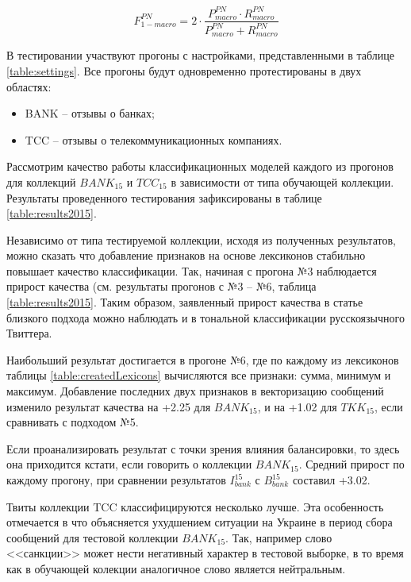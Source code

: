 \begin{equation}
    \label{eq:fmacro12}
    F_{1-macro}^{PN} = 2 \cdot \dfrac{P_{macro}^{PN} \cdot
        R_{macro}^{PN}}{P_{macro}^{PN} + R_{macro}^{PN}}
\end{equation}

В тестировании участвуют прогоны с настройками, представленными в таблице
\ref{table:settings}.
Все прогоны будут одновременно протестированы в двух областях:
\begin{itemize}
    \item BANK -- отзывы о банках;
    \item TCC -- отзывы о телекоммуникационных компаниях.
\end{itemize}



Рассмотрим качество работы классификационных моделей каждого из прогонов для
коллекций $BANK_{15}$ и $TCC_{15}$ в зависимости от типа обучающей коллекции.
Результаты проведенного тестирования зафиксированы в таблице \ref{table:results2015}.



Независимо от типа тестируемой коллекции, исходя из полученных результатов,
можно сказать что добавление признаков на основе лексиконов стабильно
повышает качество классификации.
Так, начиная с прогона №3 наблюдается прирост качества (см. результаты
прогонов с №3 -- №6, таблица \ref{table:results2015}.
Таким образом, заявленный прирост качества в статье близкого подхода
\cite{modernApproach} можно наблюдать и в тональной классификации русскоязычного
Твиттера.

Наибольший результат достигается в прогоне №6, где по каждому из лексиконов таблицы
\ref{table:createdLexicons} вычисляются все признаки: сумма, минимум и максимум.
Добавление последних двух признаков в векторизацию сообщений изменило
результат качества на +2.25 для $BANK_{15}$, и на +1.02 для $TKK_{15}$, если
сравнивать с подходом №5.

Если проанализировать результат с точки зрения влияния балансировки, то
здесь она приходится кстати, если говорить о коллекции $BANK_{15}$.
Средний прирост по каждому прогону, при сравнении результатов $I_{bank}^{15}$
с $B_{bank}^{15}$ составил +3.02.

Твиты коллекции TCC классифицируются несколько лучше. Эта особенность
отмечается в \cite{tonalityAnalysis} что объясняется ухудшением ситуации на
Украине в период сбора сообщений для тестовой коллекции $BANK_{15}$.
Так, например слово <<санкции>> может нести негативный характер в тестовой
выборке, в то время как в обучающей колекции аналогичное слово является
нейтральным.


